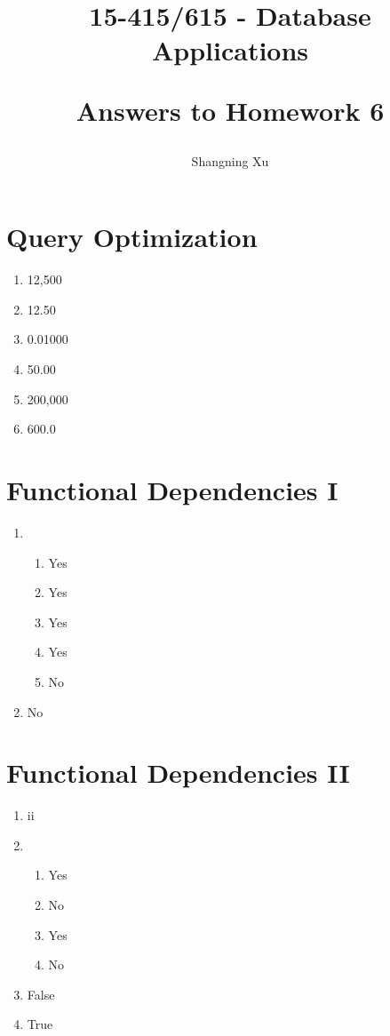\documentclass{homework}
\title{
    15-415/615 - Database Applications

    Answers to Homework 6
}
\author{Shangning Xu}
\begin{document}
\maketitle

\section{Query Optimization}

\begin{enumerate}
    \item 12,500
    \item 12.50
    \item 0.01000
    \item 50.00
    \item 200,000
    \item 600.0
\end{enumerate}

\section{Functional Dependencies I}

\begin{enumerate}
    \item \begin{enumerate}
        \item Yes
        \item Yes
        \item Yes
        \item Yes
        \item No
    \end{enumerate}
    
    \item No
\end{enumerate}

\section{Functional Dependencies II}

\begin{enumerate}
    \item ii
    \item \begin{enumerate}
        \item Yes
        \item No
        \item Yes
        \item No
    \end{enumerate}

    \item False
    
    \item True
\end{enumerate}
\end{document}
